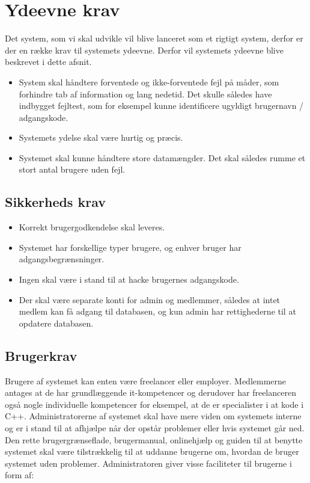 \section{Ydeevne krav}
Det system, som vi skal udvikle vil blive lanceret som et rigtigt system, derfor er der en række krav til systemets ydeevne. Derfor vil systemets ydeevne blive beskrevet i dette afsnit.   
\begin{itemize}  
     \item System skal håndtere forventede og ikke-forventede fejl på måder, som forhindre tab af information og lang nedetid. Det skulle således have indbygget fejltest, som for eksempel kunne identificere ugyldigt brugernavn / adgangskode.
     \item Systemets ydelse skal være hurtig og præcis.
     \item Systemet skal kunne håndtere store datamængder. Det skal således rumme et stort antal brugere uden fejl.
\end{itemize}

\subsection{Sikkerheds krav}
\begin{itemize}  
    \item Korrekt brugergodkendelse skal leveres.
    \item Systemet har forskellige typer brugere, og enhver bruger har adgangsbegrænsninger.
    \item Ingen skal være i stand til at hacke brugernes adgangskode.
    \item Der skal være separate konti for admin og medlemmer, således at intet medlem kan få adgang til databasen, og kun admin har rettighederne til at opdatere databasen.
\end{itemize}

\subsection{Brugerkrav}
Brugere af systemet kan enten være freelancer eller employer.  Medlemmerne antages at de har grundlæggende it-kompetencer og derudover har freelanceren også nogle individuelle kompetencer for eksempel, at de er specialister i at kode i C++. Administratorerne af systemet skal have mere viden om systemets interne og er i stand til at afhjælpe når der opstår problemer eller hvis systemet går ned. Den rette brugergrænseflade, brugermanual, onlinehjælp og guiden til at benytte systemet skal være tilstrækkelig til at uddanne brugerne om, hvordan de bruger systemet uden problemer. 
Administratoren giver visse faciliteter til brugerne i form af:

